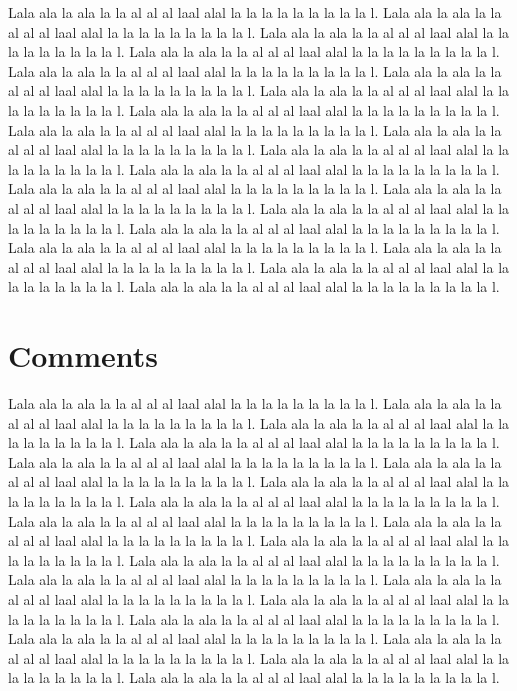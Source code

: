 \documentclass{article}
\begin{document}
Lala ala la ala la la al al al laal alal la la la la la la la la la l. Lala ala la ala la la al al al laal alal la la la la la la la la la l. Lala ala la ala la la al al al laal alal la la la la la la la la la l. Lala ala la ala la la al al al laal alal la la la la la la la la la l. Lala ala la ala la la al al al laal alal la la la la la la la la la l. Lala ala la ala la la al al al laal alal la la la la la la la la la l. Lala ala la ala la la al al al laal alal la la la la la la la la la l. Lala ala la ala la la al al al laal alal la la la la la la la la la l. Lala ala la ala la la al al al laal alal la la la la la la la la la l. Lala ala la ala la la al al al laal alal la la la la la la la la la l. Lala ala la ala la la al al al laal alal la la la la la la la la la l. Lala ala la ala la la al al al laal alal la la la la la la la la la l. Lala ala la ala la la al al al laal alal la la la la la la la la la l. Lala ala la ala la la al al al laal alal la la la la la la la la la l. Lala ala la ala la la al al al laal alal la la la la la la la la la l. Lala ala la ala la la al al al laal alal la la la la la la la la la l. Lala ala la ala la la al al al laal alal la la la la la la la la la l. Lala ala la ala la la al al al laal alal la la la la la la la la la l. Lala ala la ala la la al al al laal alal la la la la la la la la la l. Lala ala la ala la la al al al laal alal la la la la la la la la la l. 


\section{Comments}

Lala ala la ala la la al al al laal alal la la la la la la la la la l. Lala ala la ala la la al al al laal alal la la la la la la la la la l. Lala ala la ala la la al al al laal alal la la la la la la la la la l. Lala ala la ala la la al al al laal alal la la la la la la la la la l. Lala ala la ala la la al al al laal alal la la la la la la la la la l. Lala ala la ala la la al al al laal alal la la la la la la la la la l. Lala ala la ala la la al al al laal alal la la la la la la la la la l. Lala ala la ala la la al al al laal alal la la la la la la la la la l. Lala ala la ala la la al al al laal alal la la la la la la la la la l. Lala ala la ala la la al al al laal alal la la la la la la la la la l. Lala ala la ala la la al al al laal alal la la la la la la la la la l. Lala ala la ala la la al al al laal alal la la la la la la la la la l. Lala ala la ala la la al al al laal alal la la la la la la la la la l. Lala ala la ala la la al al al laal alal la la la la la la la la la l. Lala ala la ala la la al al al laal alal la la la la la la la la la l. Lala ala la ala la la al al al laal alal la la la la la la la la la l. Lala ala la ala la la al al al laal alal la la la la la la la la la l. Lala ala la ala la la al al al laal alal la la la la la la la la la l. Lala ala la ala la la al al al laal alal la la la la la la la la la l. Lala ala la ala la la al al al laal alal la la la la la la la la la l. 

\printbibliography
\nocite{*}
\end{document}
